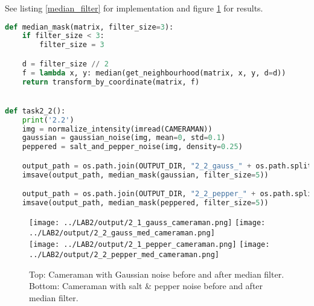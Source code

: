 See listing \ref{median_filter} for implementation and figure \ref{median_filter_results} for results.

\begin{lstlisting}[language=Python, label=median_filter, caption=Median Filter]
def median_mask(matrix, filter_size=3):
    if filter_size < 3:
        filter_size = 3

    d = filter_size // 2
    f = lambda x, y: median(get_neighbourhood(matrix, x, y, d=d))
    return transform_by_coordinate(matrix, f)


def task2_2():
    print('2.2')
    img = normalize_intensity(imread(CAMERAMAN))
    gaussian = gaussian_noise(img, mean=0, std=0.1)
    peppered = salt_and_pepper_noise(img, density=0.25)

    output_path = os.path.join(OUTPUT_DIR, "2_2_gauss_" + os.path.split(CAMERAMAN)[-1])
    imsave(output_path, median_mask(gaussian, filter_size=5))

    output_path = os.path.join(OUTPUT_DIR, "2_2_pepper_" + os.path.split(CAMERAMAN)[-1])
    imsave(output_path, median_mask(peppered, filter_size=5))
\end{lstlisting}


\begin{figure}[h!]
    \centering
    \texttt{[image: ../LAB2/output/2\_1\_gauss\_cameraman.png]}
    \texttt{[image: ../LAB2/output/2\_2\_gauss\_med\_cameraman.png]} \\
    \texttt{[image: ../LAB2/output/2\_1\_pepper\_cameraman.png]}
    \texttt{[image: ../LAB2/output/2\_2\_pepper\_med\_cameraman.png]}
    \caption{Top: Cameraman with Gaussian noise before and after median filter. \\ Bottom: Cameraman with salt \& pepper noise before and after median filter.}
    \label{median_filter_results}
\end{figure}

